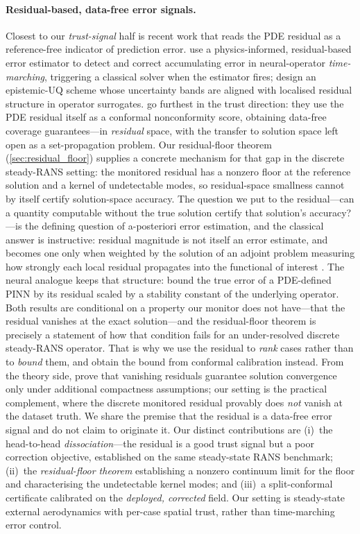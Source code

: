 \paragraph{Residual-based, data-free error signals.} Closest to our \emph{trust-signal}
half is recent work that reads the PDE residual as a reference-free indicator of prediction
error. \citet{roy2025anchor} use a physics-informed, residual-based error estimator to detect
and correct accumulating error in neural-operator \emph{time-marching}, triggering a classical
solver when the estimator fires; \citet{song2026structureaware} design an epistemic-UQ scheme
whose uncertainty bands are aligned with localised residual structure in operator surrogates.
\citet{gopakumar2025pre} go furthest in the trust direction: they use the PDE residual itself
as a conformal nonconformity score, obtaining data-free coverage guarantees---in
\emph{residual} space, with the transfer to solution space left open as a set-propagation
problem. Our residual-floor theorem (\autoref{sec:residual_floor}) supplies a concrete
mechanism for that gap in the discrete steady-RANS setting: the monitored residual has a
nonzero floor at the reference solution and a kernel of undetectable modes, so residual-space
smallness cannot by itself certify solution-space accuracy. The question we put to the residual---can a quantity computable without the true
solution certify that solution's accuracy?---is the defining question of
a-posteriori error estimation, and the classical answer is instructive: residual
magnitude is not itself an error estimate, and becomes one only when weighted by the
solution of an adjoint problem measuring how strongly each local residual propagates
into the functional of interest \citep{beckerrannacher2001dwr}. The neural analogue
keeps that structure: \citet{hillebrecht2025posteriori} bound the true error of a
PDE-defined PINN by its residual scaled by a stability constant of the underlying
operator. Both results are conditional on a property our monitor does not have---that
the residual vanishes at the exact solution---and the residual-floor theorem is
precisely a statement of how that condition fails for an under-resolved discrete
steady-RANS operator. That is why we use the residual to \emph{rank} cases rather than
to \emph{bound} them, and obtain the bound from conformal calibration instead.
From the theory side,
\citet{mukherjee2026certification} prove that vanishing residuals guarantee solution
convergence only under additional compactness assumptions; our setting is the practical
complement, where the discrete monitored residual provably does \emph{not} vanish at the
dataset truth. We share the premise that the residual is a data-free error signal and do not
claim to originate it. Our distinct contributions are (i)~the head-to-head \emph{dissociation}---the residual is a
good trust signal but a poor correction objective, established on the same steady-state RANS
benchmark; (ii)~the \emph{residual-floor theorem} establishing a nonzero continuum limit for
the floor and characterising the undetectable kernel modes; and (iii)~a split-conformal certificate calibrated on
the \emph{deployed, corrected} field. Our setting is steady-state external aerodynamics with
per-case spatial trust, rather than time-marching error control.


